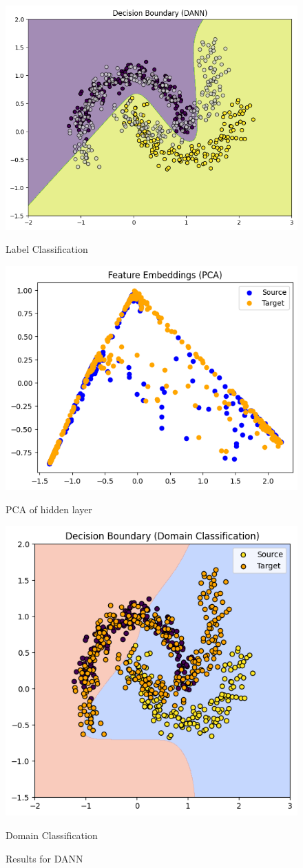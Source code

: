 \documentclass{article}
\begin{document}
\begin{figure}
\centering
\begin{minipage}{0.32\linewidth}
\centering
\includegraphics[width=0.7\linewidth]{DANN/label_decision_dann.png}
\caption{\small Label Classification}
\label{fig:label_decision_dann}
\end{minipage}
\hfill
\begin{minipage}{0.32\linewidth}
\centering
\includegraphics[width=0.7\linewidth]{DANN/feature_dann.png}
\caption{\small PCA of hidden layer}
\label{fig:feature_dann}
\end{minipage}
\hfill
\begin{minipage}{0.32\linewidth}
\centering
\includegraphics[width=0.55\linewidth]{DANN/domain_decision_dann.png}
\caption{\small Domain Classification}
\label{fig:domain_decision_dann}
\end{minipage}
\caption{\small Results for DANN}
\end{figure}
\end{document}
